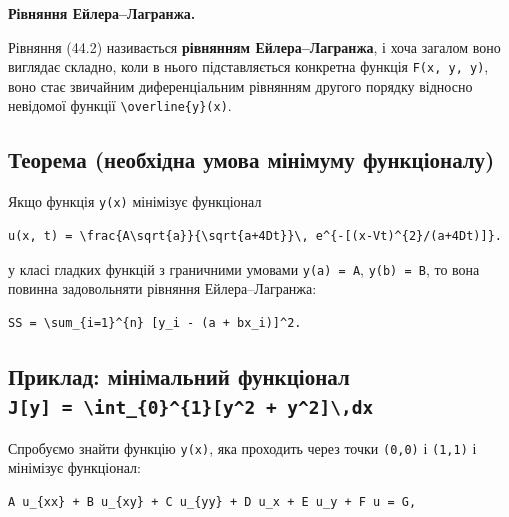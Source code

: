 \documentclass[
  ukrainian,
]{article}
\begin{document}
\textbf{Рівняння Ейлера--Лагранжа.}

Рівняння (44.2) називається \textbf{рівнянням Ейлера--Лагранжа}, і хоча
загалом воно виглядає складно, коли в нього підставляється конкретна
функція \texttt{F(x,\ y,\ y\textquotesingle{})}, воно стає звичайним
диференціальним рівнянням другого порядку відносно невідомої функції
\texttt{\textbackslash{}overline\{y\}(x)}.

\subsection{Теорема (необхідна умова мінімуму
функціоналу)}\label{ux442ux435ux43eux440ux435ux43cux430-ux43dux435ux43eux431ux445ux456ux434ux43dux430-ux443ux43cux43eux432ux430-ux43cux456ux43dux456ux43cux443ux43cux443-ux444ux443ux43dux43aux446ux456ux43eux43dux430ux43bux443}

Якщо функція \texttt{y(x)} мінімізує функціонал

\begin{verbatim}
u(x, t) = \frac{A\sqrt{a}}{\sqrt{a+4Dt}}\, e^{-[(x-Vt)^{2}/(a+4Dt)]}.
\end{verbatim}

у класі гладких функцій з граничними умовами \texttt{y(a)\ =\ A},
\texttt{y(b)\ =\ B}, то вона повинна задовольняти рівняння
Ейлера--Лагранжа:

\begin{verbatim}
SS = \sum_{i=1}^{n} [y_i - (a + bx_i)]^2.
\end{verbatim}

\subsection{\texorpdfstring{Приклад: мінімальний функціонал
\texttt{J{[}y{]}\ =\ \textbackslash{}int\_\{0\}\^{}\{1\}{[}y\^{}2\ +\ y\textquotesingle{}\^{}2{]}\textbackslash{},dx}}{Приклад: мінімальний функціонал J{[}y{]} = \textbackslash int\_\{0\}\^{}\{1\}{[}y\^{}2 + y\textquotesingle\^{}2{]}\textbackslash,dx}}\label{ux43fux440ux438ux43aux43bux430ux434-ux43cux456ux43dux456ux43cux430ux43bux44cux43dux438ux439-ux444ux443ux43dux43aux446ux456ux43eux43dux430ux43b-jy-int_01y2-y2dx}

Спробуємо знайти функцію \texttt{y(x)}, яка проходить через точки
\texttt{(0,0)} і \texttt{(1,1)} і мінімізує функціонал:

\begin{verbatim}
A u_{xx} + B u_{xy} + C u_{yy} + D u_x + E u_y + F u = G,
\end{verbatim}
\end{document}
